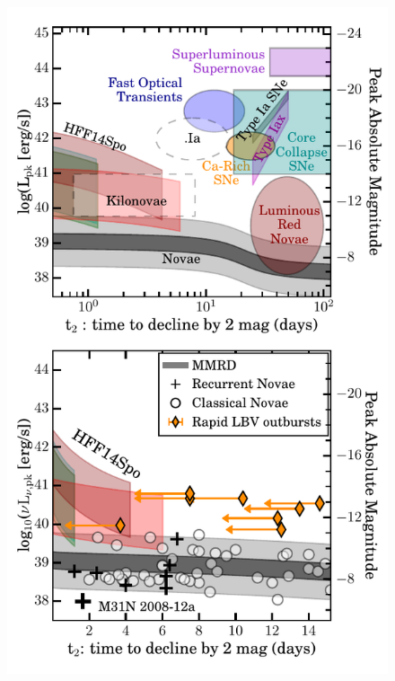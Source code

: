 \documentclass{nature_arxiv}
\begin{document}
\begin{multicols}{2}
\begin{figure}[tbp]
\begin{center}
\includegraphics[width=1\columnwidth]{./figures/peakluminosity_vs_declinetime/peakluminosity_vs_declinetime}
\caption{ \protect}
\end{center}
\end{figure}



\end{multicols}
\end{document}
